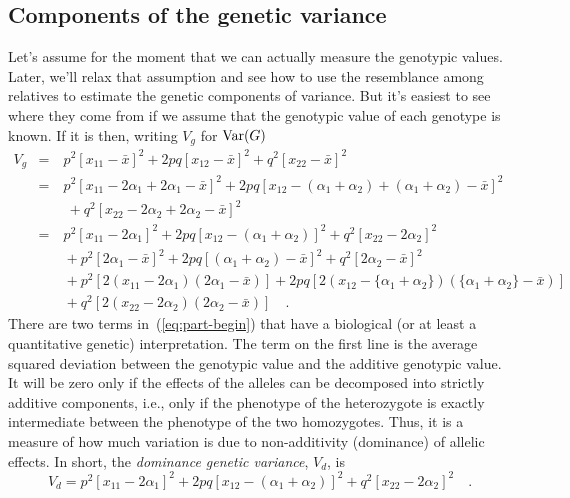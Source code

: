 \documentclass[12pt]{article}
\begin{document}
\subsection*{Components of the genetic variance}

Let's assume for the moment that we can actually measure the genotypic
values. Later, we'll relax that assumption and see how to use the
resemblance among relatives to estimate the genetic components of
variance. But it's easiest to see where they come from if we assume
that the genotypic value of each genotype is known. If it is then,
writing $V_g$ for $\mbox{Var}(G)$
\begin{eqnarray}
V_g &=&\ p^2[x_{11} - {\bar x}]^2 + 2pq[x_{12} - {\bar x}]^2
     + q^2[x_{22} - {\bar x}]^2 \label{eq:v-g} \\
    &=&\ p^2[x_{11} - 2\alpha_1 + 2\alpha_1 - {\bar x}]^2
     + 2pq[x_{12} - (\alpha_1 + \alpha_2) + (\alpha_1 + \alpha_2)
                - {\bar x}]^2 \nonumber \\
     &&\ \ + q^2[x_{22} - 2\alpha_2 + 2\alpha_2 - {\bar x}]^2
     \nonumber \\
    &=&\ p^2[x_{11} - 2\alpha_1]^2 + 2pq[x_{12} - (\alpha_1+\alpha_2)]^2
       + q^2[x_{22} - 2\alpha_2]^2 \nonumber \\
     &&\ + p^2[2\alpha_1 - {\bar x}]^2 + 2pq[(\alpha_1 + \alpha_2) - {\bar x}]^2
       + q^2[2\alpha_2 - {\bar x}]^2 \nonumber \\
     &&\ + p^2[2(x_{11} - 2\alpha_1)(2\alpha_1 - {\bar x})]
       +2pq[2(x_{12} - \{\alpha_1+\alpha_2\})(\{\alpha_1+\alpha_2\} -
     {\bar x})] \nonumber \\
     &&\ +q^2[2(x_{22} - 2\alpha_2)(2\alpha_2 - {\bar x})] \quad .
     \label{eq:part-begin}
\end{eqnarray}
There are two terms in~(\ref{eq:part-begin}) that have a biological
(or at least a quantitative genetic) interpretation.  The term on the
first line is the average squared deviation between the genotypic
value and the additive genotypic value.  It will be zero only if the
effects of the alleles can be decomposed into strictly additive
components, i.e., only if the phenotype of the heterozygote is exactly
intermediate between the phenotype of the two homozygotes.  Thus, it
is a measure of how much variation is due to non-additivity
(dominance) of allelic effects.  In short, the {\it dominance genetic
variance}, $V_d$, is
\begin{equation}
V_d = p^2[x_{11} - 2\alpha_1]^2 + 2pq[x_{12} - (\alpha_1+\alpha_2)]^2
          + q^2[x_{22} - 2\alpha_2]^2 \quad .\label{eq:v-d}
\end{equation}
\end{document}
